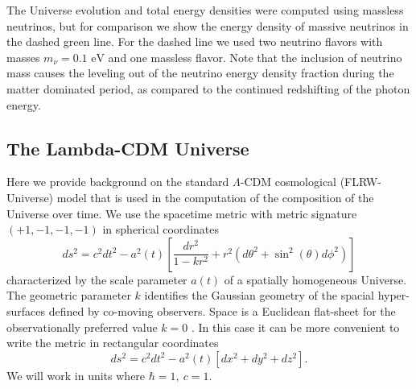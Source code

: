 \documentclass[universe,article,submit,moreauthors,pdftex,a4paper]{Definitions/mdpi}
\newcommand{\eV}{\text{ eV}}
\newcommand{\beqn}{\begin{equation}}
\newcommand{\eeqn}{\end{equation}}
\begin{document}
The Universe evolution and total energy densities were computed using massless neutrinos, but  for comparison we show the energy density of massive neutrinos in the dashed green line. For the dashed line we used two neutrino flavors with masses $m_\nu=0.1\eV$ and one massless flavor.  Note that the inclusion of neutrino mass causes the leveling out of the neutrino energy density fraction during the matter dominated period, as compared to the continued redshifting of the photon energy.

\subsection{The Lambda-CDM Universe}\label{sec:Cosmo}
\noindent Here we provide background on the standard $\Lambda$-CDM cosmological (FLRW-Universe) model that is used in the computation of the composition of the Universe over time. We use the spacetime metric with metric signature $(+1,-1,-1,-1)$ in spherical coordinates
\beqn\label{metric}
ds^2=c^2dt^2-a^2(t)\left[ \frac{dr^2}{1-kr^2}+r^2(d\theta^2+\sin^2(\theta)d\phi^2)\right]
\eeqn
characterized  by the scale parameter $a(t)$  of a spatially homogeneous  Universe. The geometric parameter $k$ identifies the Gaussian geometry of the spacial hyper-surfaces defined by co-moving observers. Space is a Euclidean flat-sheet for the observationally preferred value $k=0$ \cite{Planck:2013pxb,Planck:2015fie,Planck:2018vyg}. In this case it can be more convenient to write the metric in rectangular coordinates
\beqn\label{metric2}
ds^2=c^2dt^2-a^2(t)\left[ dx^2+dy^2+dz^2\right].
\eeqn
We will work in units where $\hbar=1,\ c=1$.
\end{document}
